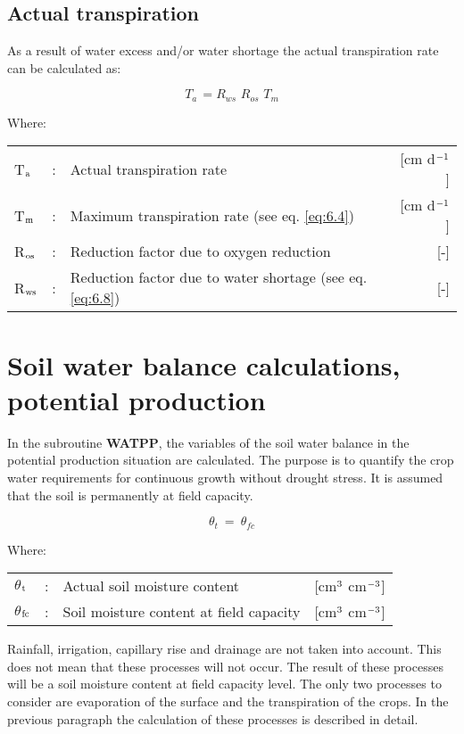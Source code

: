 \subsection{Actual transpiration}
As a result of water excess and/or water shortage the actual transpiration rate can be
calculated as:

\begin{equation}
\label{eq:6.14}
T_{a~} = R_{ws} \,\, R_{os} \,\, T_{m} 
\end{equation}

Where:\\[5pt]
\begin{tabularx}{\textwidth}{llXr}
 T$_{{\rm a}}$ &:& Actual transpiration rate & [cm d$^{{\rm -1}}$]\\
 T$_{{\rm m}}$ &:& Maximum transpiration rate (see eq. \ref{eq:6.4}) & [cm d$^{{\rm -1}}$]\\
 R$_{{\rm os}}$ &:& Reduction factor due to oxygen reduction & [-]\\
 R$_{{\rm ws}}$ &:& Reduction factor due to water shortage (see eq. \ref{eq:6.8}) & [-]\\
\end{tabularx}
 
\section{Soil water balance calculations, potential production}
\label{sec:WATPP}

In the subroutine {\bf WATPP}, the variables of the soil water balance in the potential 
production situation are calculated. The purpose is to quantify the crop water requirements for
continuous growth without drought stress. It is assumed that the soil is permanently at
field capacity.

\begin{equation}
\label{eq:6.15}
\theta  _{t} ~ =~\theta  _{fc} 
\end{equation}

Where:\\[5pt]
\begin{tabularx}{\textwidth}{llXr}
 $\theta$$_{{\rm t}}$ &:& Actual soil moisture content & [cm$^{{\rm 3}}$ cm$^{{\rm -3}}$]\\
 $\theta$$_{{\rm fc}}$ &:& Soil moisture content at field capacity & [cm$^{{\rm 3}}$ cm$^{{\rm -3}}$]\\
\end{tabularx}
 
Rainfall, irrigation, capillary rise and drainage are not taken into account. This does not
mean that these processes will not occur. The result of these processes will be a soil
moisture content at field capacity level. The only two processes to consider are evaporation of 
the surface and the transpiration of the crops. In the previous paragraph the
calculation of these processes is described in detail.

